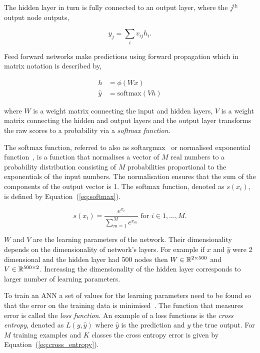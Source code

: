 The hidden layer in turn is fully connected to an output layer, where the
\(j^{\text{th}}\) output node outputs,

\[y_{j} = \sum_{i} v_{ij} h_{i}.\]

Feed forward networks make predictions using forward propagation which in matrix
notation is described by,

\begin{align}\label{eq:neural_network_equations}
h & = \phi(Wx) \\ \label{eq:neural_network_equations_two}
\hat{y} & = \text{softmax}(Vh)
\end{align}

where \(W\) is a weight matrix connecting the input and hidden layers, \(V\) is
a weight matrix connecting the hidden and output layers and the output layer
transforms the raw scores to a probability via a \textit{softmax function}.

The softmax function, referred to also as softargmax~\cite{Goodfellow2016} or
normalised exponential function~\cite{Bishop2006}, is a function that normalises
a vector of \(M\) real numbers to a probability distribution consisting of \(M\)
probabilities proportional to the exponentials of the input numbers. The
normalisation ensures that the sum of the components of the output vector is 1.
The softmax function, denoted as \(s(x_i)\),
is defined by Equation~(\ref{eq:softmax}).

\begin{equation}\label{eq:softmax}
    s(x_i) = \frac{e^{x_i}}{\sum\limits_{m=1}^{M} e^{x_m}} \text{ for } i \in 1, \dots, M.
\end{equation}

\(W\) and \(V\) are the learning parameters of the network. Their dimensionality
depends on the dimensionality of network's layers. For example if \(x\) and \(\hat{y}\)
were 2 dimensional and the hidden layer had 500 nodes then \(W \in \mathbb{R}^{2 \times 500}\)
and \(V \in \mathbb{R}^{500 \times 2}\). Increasing the dimensionality of the hidden
layer corresponds to larger number of learning parameters.

To train an ANN a set of values for the learning parameters need to be found so
that the error on the training data is minimised~\cite{Gurney2007}. The function that measures
error is called the \textit{loss function}.
An example of a loss functions is the
\textit{cross entropy}, denoted as \(L(y, \hat{y})\) where \(\hat{y}\) is the
prediction and \(y\) the true output. For \(M\) training examples and \(K\)
classes the cross entropy error is given by Equation~(\ref{eq:cross_entropy}).

